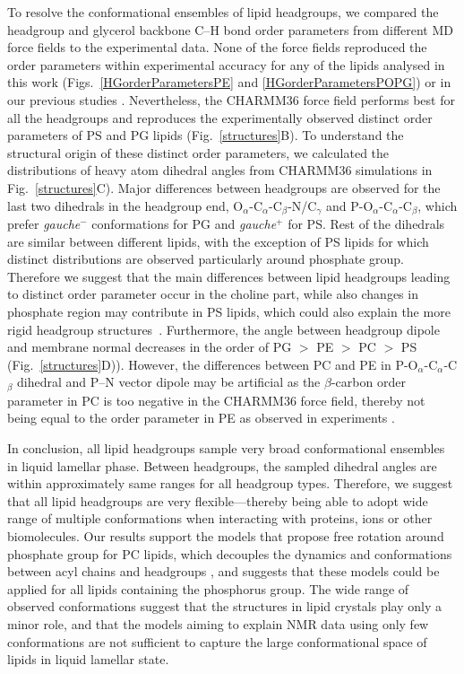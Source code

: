 \documentclass[aps,prl,superscriptaddress,twocolumn]{revtex4}
\begin{document}
To resolve the conformational ensembles of lipid headgroups, we compared the headgroup and glycerol backbone C--H bond order parameters from different MD force fields to the experimental data. None of the force fields reproduced the order parameters within experimental accuracy for any of the lipids analysed in this work (Figs.~\ref{HGorderParametersPE} and \ref{HGorderParametersPOPG}) or in our previous studies \cite{botan15,antila19}. Nevertheless, the CHARMM36 force field performs best for all the headgroups and reproduces the experimentally observed distinct order parameters of PS and PG lipids (Fig.~\ref{structures}B). To understand the structural origin of these distinct order parameters, we calculated the distributions of heavy atom dihedral angles from CHARMM36 simulations in Fig.~\ref{structures}C). Major differences between headgroups are observed for the last two dihedrals in the headgroup end,  O$_\alpha$-C$_\alpha$-C$_\beta$-N/C$_\gamma$ and P-O$_\alpha$-C$_\alpha$-C$_\beta$, which prefer \textit{gauche$^-$} conformations for PG and \textit{gauche$^+$} for PS. Rest of the dihedrals are similar between different lipids, with the exception of PS lipids for which distinct distributions are observed particularly around phosphate group. Therefore we suggest that the main differences between lipid headgroups leading to distinct order parameter occur in the choline part, while also changes in phosphate region may contribute in PS lipids, which could also explain the more rigid headgroup structures~\cite{browning80,buldt81}.
Furthermore, the angle between headgroup dipole and membrane normal decreases in the order of PG $>$ PE  $>$ PC  $>$ PS (Fig.~\ref{structures}D)). However, the differences between PC and PE in P-O$_\alpha$-C$_\alpha$-C$_\beta$ dihedral
and P--N vector dipole may be artificial as the $\beta$-carbon order parameter in PC is too negative in the CHARMM36 force field, thereby not being equal to the order parameter in PE as observed in experiments \cite{botan15}.

In conclusion, all lipid headgroups sample very broad conformational ensembles in liquid lamellar phase.
Between headgroups, the sampled dihedral angles are within approximately same ranges for all headgroup types. Therefore, we suggest that all lipid headgroups are very flexible---thereby being
able to adopt wide range of multiple conformations when interacting with proteins, ions or other biomolecules. Our results support the models that propose free rotation around phosphate group for PC lipids, which decouples the dynamics and conformations between acyl chains and headgroups \cite{klauda08c,antila21b}, and suggests that these models could be applied for all lipids containing the phosphorus group. The wide range of observed conformations suggest that the structures in lipid crystals \cite{buldt81,pascher92} play only a minor role, and that the models aiming to explain NMR data using only few conformations \cite{seelig77c,davis83,Semchyschyn04,akutsu20} are not sufficient to capture the large conformational space of lipids in liquid lamellar state.
\end{document}
